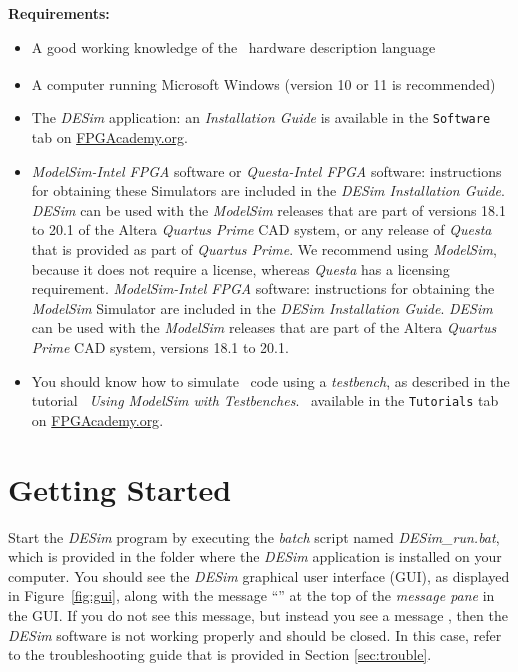 {\bf Requirements:}
\vspace{-1em}
\begin{itemize}
	\item A good working knowledge of the \hdlName~hardware description language
\item A computer running Microsoft\textsuperscript{\textregistered}
Windows\textsuperscript{\textregistered} (version 10 or 11 is
recommended)\fi
\item The {\it DESim} application: an {\it Installation Guide} 
is available in the \texttt{Software} tab on 
\href{https://www.fpgacademy.org/tools.html}{FPGAcademy.org}.
\item 
\ifquesta
{{\it ModelSim-Intel FPGA} software or {\it Questa-Intel FPGA} software: instructions for 
obtaining these Simulators are included in the {\it DESim Installation Guide}. {\it DESim} can 
be used with the {\it ModelSim} releases that are part of versions 18.1 to 20.1 of the 
Altera {\it Quartus Prime} CAD system, or any release of {\it Questa} that is provided as
part of {\it Quartus Prime}.} We recommend using {\it ModelSim}, because it does not require a
license, whereas {\it Questa} has a licensing requirement.
\else
{{\it ModelSim-Intel FPGA} software: instructions for obtaining the {\it ModelSim}
Simulator are included in the {\it DESim Installation Guide}. {\it DESim} can be used with 
the {\it ModelSim} releases that are part of the Altera {\it Quartus Prime} CAD system, 
versions 18.1 to 20.1.}
\fi
\item You should know how to simulate \hdlName~code using a {\it testbench}, as described
in the tutorial\fi
{\it~Using ModelSim with Testbenches}\fi. \fi~available in 
the \texttt{Tutorials} tab on
\href{https://www.fpgacademy.org/tutorials.html}{FPGAcademy.org}.
\end{itemize}

\newpage

\section{Getting Started}
\label{sec:getting_started}
Start the {\it DESim} program by executing the {\it batch} script named {\it DESim\_run.bat},
which is provided in the folder where the {\it DESim} application is installed on your computer. 
You should see the {\it DESim} graphical user interface (GUI), as displayed in 
Figure~\ref{fig:gui}, along with the message ``'' at 
the top of the {\it message pane} in the GUI. If you do not see this message, but instead 
you see a message , then the {\it DESim} software is not working
properly and should be closed. In this case, refer to the troubleshooting guide that is
provided in Section \ref{sec:trouble}.

